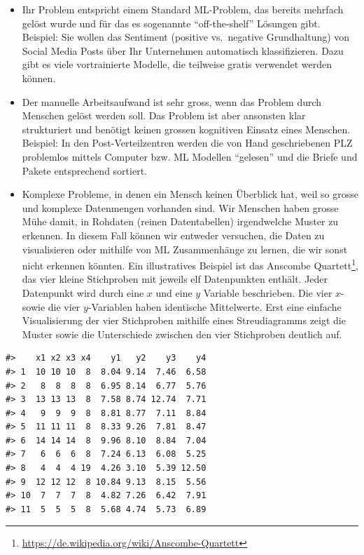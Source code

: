 \documentclass[
]{book}
\providecommand{\tightlist}{%
  \setlength{\itemsep}{0pt}\setlength{\parskip}{0pt}}
\begin{document}
\begin{itemize}
\tightlist
\item
  Ihr Problem entspricht einem Standard ML-Problem, das bereits mehrfach gelöst wurde und für das es sogenannte ``off-the-shelf'' Lösungen gibt. Beispiel: Sie wollen das Sentiment (positive vs.~negative Grundhaltung) von Social Media Posts über Ihr Unternehmen automatisch klassifizieren. Dazu gibt es viele vortrainierte Modelle, die teilweise gratis verwendet werden können.
\item
  Der manuelle Arbeitsaufwand ist sehr gross, wenn das Problem durch Menschen gelöst werden soll. Das Problem ist aber ansonsten klar strukturiert und benötigt keinen grossen kognitiven Einsatz eines Menschen. Beispiel: In den Post-Verteilzentren werden die von Hand geschriebenen PLZ problemlos mittels Computer bzw. ML Modellen ``gelesen'' und die Briefe und Pakete entsprechend sortiert.
\item
  Komplexe Probleme, in denen ein Mensch keinen Überblick hat, weil so grosse und komplexe Datenmengen vorhanden sind. Wir Menschen haben grosse Mühe damit, in Rohdaten (reinen Datentabellen) irgendwelche Muster zu erkennen. In diesem Fall können wir entweder versuchen, die Daten zu visualisieren oder mithilfe von ML Zusammenhänge zu lernen, die wir sonst nicht erkennen könnten. Ein illustratives Beispiel ist das Anscombe Quartett\footnote{\url{https://de.wikipedia.org/wiki/Anscombe-Quartett}}, das vier kleine Stichproben mit jeweils elf Datenpunkten enthält. Jeder Datenpunkt wird durch eine \(x\) und eine \(y\) Variable beschrieben. Die vier \(x\)- sowie die vier \(y\)-Variablen haben identische Mittelwerte. Erst eine einfache Visualisierung der vier Stichproben mithilfe eines Streudiagramms zeigt die Muster sowie die Unterschiede zwischen den vier Stichproben deutlich auf.
\end{itemize}

\begin{verbatim}
#>    x1 x2 x3 x4    y1   y2    y3    y4
#> 1  10 10 10  8  8.04 9.14  7.46  6.58
#> 2   8  8  8  8  6.95 8.14  6.77  5.76
#> 3  13 13 13  8  7.58 8.74 12.74  7.71
#> 4   9  9  9  8  8.81 8.77  7.11  8.84
#> 5  11 11 11  8  8.33 9.26  7.81  8.47
#> 6  14 14 14  8  9.96 8.10  8.84  7.04
#> 7   6  6  6  8  7.24 6.13  6.08  5.25
#> 8   4  4  4 19  4.26 3.10  5.39 12.50
#> 9  12 12 12  8 10.84 9.13  8.15  5.56
#> 10  7  7  7  8  4.82 7.26  6.42  7.91
#> 11  5  5  5  8  5.68 4.74  5.73  6.89
\end{verbatim}
\end{document}
